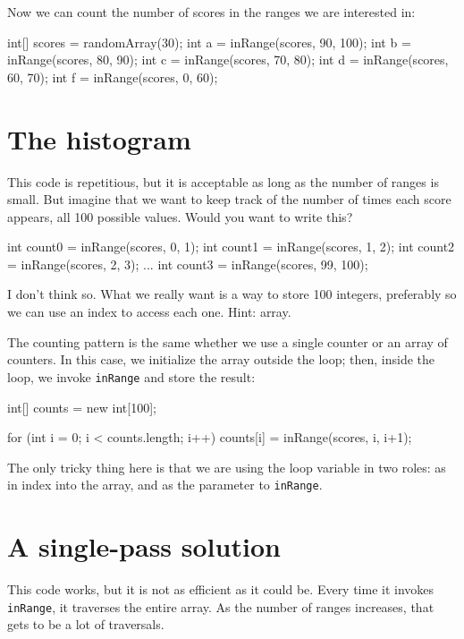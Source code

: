 Now we can count the number of scores in the ranges we are
interested in:

\begin{code}
int[] scores = randomArray(30);
int a = inRange(scores, 90, 100);
int b = inRange(scores, 80, 90);
int c = inRange(scores, 70, 80);
int d = inRange(scores, 60, 70);
int f = inRange(scores, 0, 60);
\end{code}


\section{The histogram}

This code is repetitious, but it is acceptable as
long as the number of ranges is small.  But imagine that
we want to keep track of the number of times each score appears,
all 100 possible values.  Would you want to write this?

\begin{code}
int count0 = inRange(scores, 0, 1);
int count1 = inRange(scores, 1, 2);
int count2 = inRange(scores, 2, 3);
...
int count3 = inRange(scores, 99, 100);
\end{code}

I don't think so.  What we really want is a way to store 100 integers,
preferably so we can use an index to access each one.  Hint: array.

The counting pattern is the same whether we use a single counter or an
array of counters.  In this case, we initialize the array outside the
loop; then, inside the loop, we invoke {\tt inRange} and store the
result:

\begin{code}
    int[] counts = new int[100];

    for (int i = 0; i < counts.length; i++) {
        counts[i] = inRange(scores, i, i+1);
    }
\end{code}
%
The only tricky thing here is that we are using the loop variable
in two roles: as in index into the array, and as the parameter to
{\tt inRange}.


\section{A single-pass solution}
\label{singlepass}

This code works, but it is not as efficient as it could
be.  Every time it invokes {\tt inRange}, it traverses the
entire array.  As the number of ranges increases, that gets
to be a lot of traversals.


